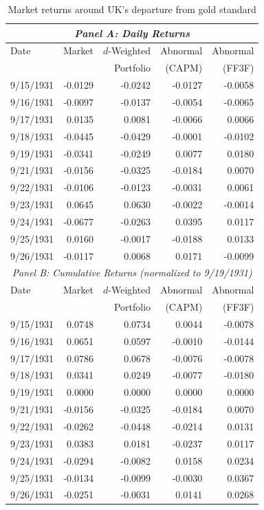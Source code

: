 \begin{table}[h]
\centering
\small
\begin{tabular}{lrrrr}
\toprule
\multicolumn{5}{c}{\textit{Panel A: Daily Returns}} \\
\midrule
Date & Market & $d$-Weighted & Abnormal & Abnormal \\
     &        & Portfolio    & (CAPM)   & (FF3F) \\
\midrule
9/15/1931 & -0.0129 & -0.0242 & -0.0127 & -0.0058 \\
9/16/1931 & -0.0097 & -0.0137 & -0.0054 & -0.0065 \\
9/17/1931 & 0.0135 & 0.0081 & -0.0066 & 0.0066 \\
9/18/1931 & -0.0445 & -0.0429 & -0.0001 & -0.0102 \\
9/19/1931 & -0.0341 & -0.0249 & 0.0077 & 0.0180 \\
\rowcolor{gray!20} 9/21/1931 & -0.0156 & -0.0325 & -0.0184 & 0.0070 \\
9/22/1931 & -0.0106 & -0.0123 & -0.0031 & 0.0061 \\
9/23/1931 & 0.0645 & 0.0630 & -0.0022 & -0.0014 \\
9/24/1931 & -0.0677 & -0.0263 & 0.0395 & 0.0117 \\
9/25/1931 & 0.0160 & -0.0017 & -0.0188 & 0.0133 \\
9/26/1931 & -0.0117 & 0.0068 & 0.0171 & -0.0099 \\
\midrule
\multicolumn{5}{c}{\textit{Panel B: Cumulative Returns (normalized to 9/19/1931)}} \\
\midrule
Date & Market & $d$-Weighted & Abnormal & Abnormal \\
     &        & Portfolio    & (CAPM)   & (FF3F) \\
\midrule
9/15/1931 & 0.0748 & 0.0734 & 0.0044 & -0.0078 \\
9/16/1931 & 0.0651 & 0.0597 & -0.0010 & -0.0144 \\
9/17/1931 & 0.0786 & 0.0678 & -0.0076 & -0.0078 \\
9/18/1931 & 0.0341 & 0.0249 & -0.0077 & -0.0180 \\
9/19/1931 & 0.0000 & 0.0000 & 0.0000 & 0.0000 \\
\rowcolor{gray!20} 9/21/1931 & -0.0156 & -0.0325 & -0.0184 & 0.0070 \\
9/22/1931 & -0.0262 & -0.0448 & -0.0214 & 0.0131 \\
9/23/1931 & 0.0383 & 0.0181 & -0.0237 & 0.0117 \\
9/24/1931 & -0.0294 & -0.0082 & 0.0158 & 0.0234 \\
9/25/1931 & -0.0134 & -0.0099 & -0.0030 & 0.0367 \\
9/26/1931 & -0.0251 & -0.0031 & 0.0141 & 0.0268 \\
\bottomrule
\end{tabular}
\caption{Market returns around UK's departure from gold standard}
\label{tab:R6_market_metrics}
\end{table}

